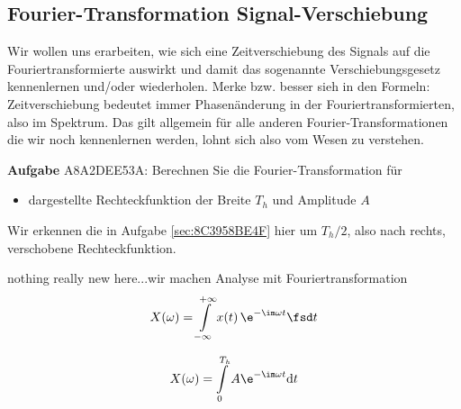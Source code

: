 \subsection{Fourier-Transformation Signal-Verschiebung}
\label{sec:A8A2DEE53A}
\begin{Ziel}
Wir wollen uns erarbeiten, wie sich eine Zeitverschiebung des Signals auf die
Fouriertransformierte auswirkt und damit das sogenannte Verschiebungsgesetz
kennenlernen und/oder wiederholen.
Merke bzw. besser sieh in den Formeln:
Zeitverschiebung bedeutet immer Phasenänderung in der Fouriertransformierten,
also im Spektrum. Das gilt allgemein für alle anderen Fourier-Transformationen
die wir noch kennenlernen werden, lohnt sich also vom Wesen zu verstehen.
\end{Ziel}
\textbf{Aufgabe} {\tiny A8A2DEE53A}: Berechnen Sie die Fourier-Transformation für
\begin{itemize}
\item dargestellte Rechteckfunktion der Breite $T_h$ und Amplitude $A$
\end{itemize}
%
\begin{figure}[h!]
\centering
{}
\end{figure}
%
Wir erkennen die in Aufgabe \ref{sec:8C3958BE4F} hier um $T_h/2$, also nach rechts,
verschobene Rechteckfunktion.


\begin{Werkzeug}
nothing really new here...wir machen
Analyse mit Fouriertransformation
\begin{align}
X(\omega) = \int\limits_{-\infty}^{+\infty} x(t) \, \e^{-\im \omega t} \fsd t
\end{align}
\end{Werkzeug}
\begin{Ansatz}
\begin{equation}
X(\omega) = \int\limits_{0}^{T_h} A \e^{-\im \omega t} \mathrm{d}t
\end{equation}
\end{Ansatz}


